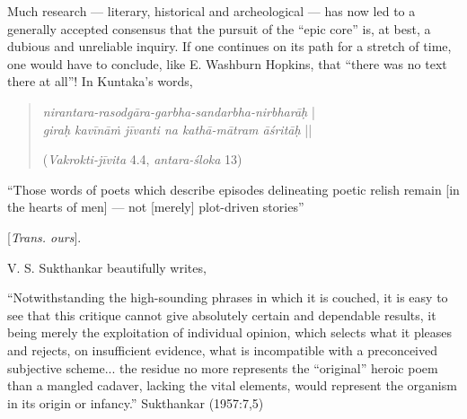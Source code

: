 Much research --- literary, historical and archeological --- has now led to a generally accepted consensus that the pursuit of the “epic core” is, at best, a dubious and unreliable inquiry. If one continues on its path for a stretch of time, one would have to conclude, like E. Washburn Hopkins, that “there was no text there at all”! In Kuntaka's words, 
\begin{quote}
{{\sl nirantara-rasodgāra-garbha-sandarbha-nirbharāḥ}} |\\
{\sl giraḥ kavīnāṁ jīvanti na kathā-mātram āśritāḥ} || 

\hfill({\sl Vakrokti-jīvita} 4.4, {\sl antara-śloka} 13)
\end{quote}

\begin{myquote}
``Those words of poets which describe episodes delineating poetic relish remain [in the hearts of men] --- not [merely] plot-driven stories'' 

\hfill [{\sl Trans. ours}].
\end{myquote}

V. S. Sukthankar beautifully writes, 

\begin{myquote}
“Notwithstanding the high-sounding phrases in which it is couched, it is easy to see that this critique cannot give absolutely certain and dependable results, it being merely the exploitation of individual opinion, which selects what it pleases and rejects, on insufficient evidence, what is incompatible with a preconceived subjective scheme... the residue no more represents the “original” heroic poem than a mangled cadaver, lacking the vital elements, would represent the organism in its origin or infancy.”
\hfill Sukthankar (1957:7,5)\\[-.6cm]
\end{myquote}

